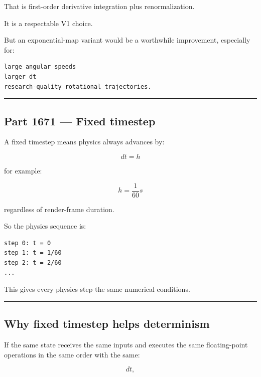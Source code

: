 That is first-order derivative integration plus renormalization.

It is a respectable V1 choice.

But an exponential-map variant would be a worthwhile improvement, especially for:

\begin{verbatim}
large angular speeds
larger dt
research-quality rotational trajectories.
\end{verbatim}

\begin{center}\rule{0.5\linewidth}{0.5pt}\end{center}

\subsection{Part 1671 --- Fixed timestep}\label{06-engine-ii-ch037-part-1671-fixed-timestep}

\hypertarget{06-engine-ii-ch037-part-1671-fixed-timestep}{}

A fixed timestep means physics always advances by:

\[
\boxed{
dt=h
}
\]

for example:

\[
h=\frac1{60}s
\]

regardless of render-frame duration.

So the physics sequence is:

\begin{verbatim}
step 0: t = 0
step 1: t = 1/60
step 2: t = 2/60
...
\end{verbatim}

This gives every physics step the same numerical conditions.

\begin{center}\rule{0.5\linewidth}{0.5pt}\end{center}

\subsection{Why fixed timestep helps determinism}\label{06-engine-ii-ch037-why-fixed-timestep-helps-determinism}

\hypertarget{06-engine-ii-ch037-why-fixed-timestep-helps-determinism}{}

If the same state receives the same inputs and executes the same floating-point operations in the same order with the same:

\[
dt,
\]

